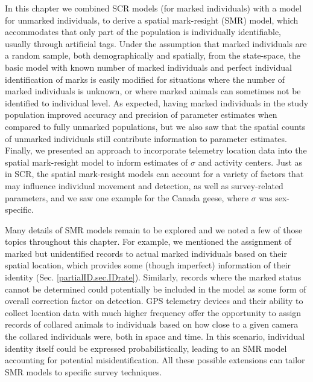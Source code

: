 In this chapter we combined SCR models (for marked individuals) with a
model for unmarked individuals,
to derive a spatial mark-resight (SMR) model, which
accommodates that only part of the population is individually identifiable,
usually through artificial tags. Under the assumption that marked
individuals are a random sample, both demographically and spatially,
from the state-space, the basic model with known number of marked
individuals and perfect individual identification of marks
is easily
modified for situations where the number of marked individuals is
unknown, or where marked animals can sometimes not be identified to
individual level. As expected, having marked individuals in the study
population improved accuracy and precision of parameter estimates when
compared to fully unmarked populations, but we also saw that the
spatial counts of unmarked individuals still contribute information to
parameter estimates. Finally, we presented an approach to
incorporate telemetry location data into the spatial mark-resight
model to inform estimates of $\sigma$ and activity centers. Just as in
SCR, the spatial mark-resight models can account for a variety of
factors that may influence individual movement and detection, as well
as survey-related parameters, and we saw one example for the Canada
geese, where $\sigma$ was sex-specific.

Many details of SMR models remain to be explored and we noted a few
of those topics throughout this chapter. For example, we mentioned the
assignment of marked but unidentified records to actual marked
individuals based on their spatial location, which provides some
(though imperfect) information of their identity
(Sec. \ref{partialID.sec.IDrate}). Similarly, records where the marked
status cannot be determined could potentially be included in the model
as some form of overall correction factor on detection. GPS telemetry
devices and their ability to collect location data with much higher
frequency offer the opportunity to assign records of collared animals
to individuals based on how close to a given camera the collared
individuals were, both in space and time. In this scenario, individual
identity itself could be expressed probabilistically, leading to an
SMR model accounting for potential misidentification. All these
possible extensions can tailor SMR models to specific survey
techniques.

